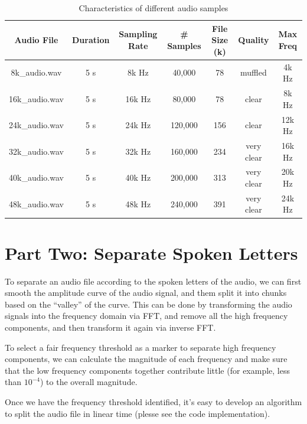 \documentclass[11pt, oneside]{article}   	%
\begin{document}
\begin{table}[ht]
\centering
\caption{Characteristics of different audio samples}
\label{tab:compare}
\begin{tabular}{|c|c|c|c|c|c|c|}
\hline
Audio File & Duration & Sampling Rate & \# Samples & File Size (k) & Quality & Max Freq\\
\hline
\hline
8k\_audio.wav & 5 s & 8k Hz & 40,000  & 78 & muffled & 4k Hz\\
16k\_audio.wav & 5 s & 16k Hz & 80,000  & 78 & clear & 8k Hz\\
24k\_audio.wav & 5 s & 24k Hz & 120,000  & 156 & clear & 12k Hz\\
32k\_audio.wav & 5 s & 32k Hz & 160,000  & 234 & very clear & 16k Hz\\
40k\_audio.wav & 5 s & 40k Hz & 200,000  & 313 & very clear & 20k Hz\\
48k\_audio.wav & 5 s & 48k Hz & 240,000  & 391 & very clear & 24k Hz\\
\hline
\end{tabular}
\end{table}

\section{Part Two: Separate Spoken Letters}
To separate an audio file according to the spoken letters of the audio, we can first smooth the amplitude curve of the audio signal, and them split it into chunks based on the ``valley'' of the curve. This can be done by transforming the audio signals into the frequency domain via FFT, and remove all the high frequency components, and then transform it again via inverse FFT. 

To select a fair frequency threshold as a marker to separate high frequency components, we can calculate the magnitude of each frequency and make sure that the low frequency components together contribute little (for example, less than $10^{-4}$) to the overall magnitude.  

Once we have the frequency threshold identified, it's easy to develop an algorithm to split the audio file in linear time (plesse see the code implementation).
\end{document}
